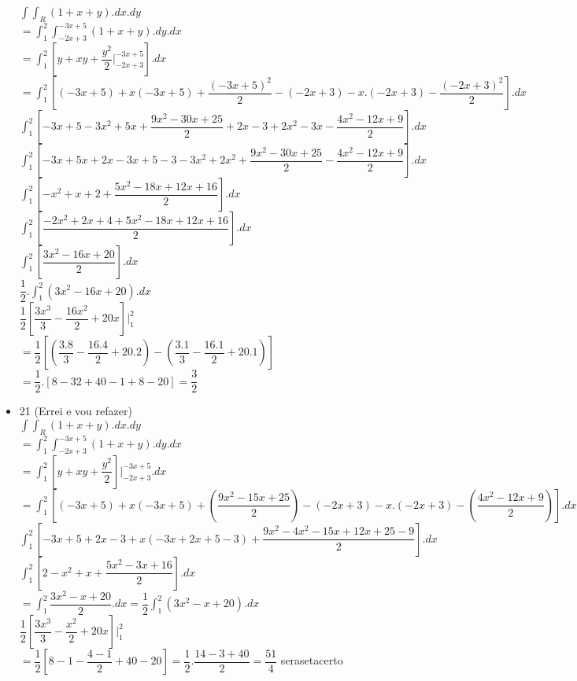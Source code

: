 \documentclass{article}
\begin{document}
\begin{itemize}
	$\int \int_R (1+x+y).dx.dy$\\
	$= \int_1^2 \int_{-2x+3}^{-3x+5} (1+x+y).dy.dx$\\
	$= \int_1^2[y+xy+\dfrac{y^2}{2}|_{-2x+3}^{-3x+5}].dx$\\
	$=\int_1^2[(-3x+5)+x(-3x+5)+\dfrac{(-3x+5)^2}{2}-(-2x+3)-x.(-2x+3)-\dfrac{(-2x+3)^2}{2}].dx$\\
	$\int_1^2[-3x+5-3x^2+5x+\dfrac{9x^2-30x+25}{2}+2x-3+2x^2-3x-\dfrac{4x^2-12x+9}{2}].dx$\\
	$\int_1^2[-3x+5x+2x-3x+5-3-3x^2+2x^2+\dfrac{9x^2-30x+25}{2}-\dfrac{4x^2-12x+9}{2}].dx$\\
	$\int_1^2[-x^2+x+2+\dfrac{5x^2-18x+12x+16}{2}].dx$\\
	$\int_1^2[\dfrac{-2x^2+2x+4+5x^2-18x+12x+16}{2}].dx$\\
	$\int_1^2[\dfrac{3x^2-16x+20}{2}].dx$\\
	$\dfrac{1}{2}.\int_1^2(3x^2-16x+20).dx$\\
	$\dfrac{1}{2}[\dfrac{3x^3}{3}-\dfrac{16x^2}{2}+20x]|_1^2$\\
	$=\dfrac{1}{2}[(\dfrac{3.8}{3}-\dfrac{16.4}{2}+20.2)-(\dfrac{3.1}{3}-\dfrac{16.1}{2}+20.1)]$\\
	$=\dfrac{1}{2}.[8-32+40-1+8-20]=\dfrac{3}{2}$
	\item 21 (Errei e vou refazer)\\
	$\int \int_R (1+x+y).dx.dy$\\
	$=\int_1^2\int_{-2x+3}^{-3x+5}(1+x+y).dy.dx$\\
	$=\int_1^2 [y+xy+\dfrac{y^2}{2}]|_{-2x+3}^{-3x+5}.dx$\\
	$=\int_1^2 [(-3x+5)+x(-3x+5)+(\dfrac{9x^2-15x+25}{2})-(-2x+3)-x.(-2x+3)-(\dfrac{4x^2-12x+9}{2})].dx$\\
	$\int_1^2 [-3x+5+2x-3+x(-3x+2x+5-3)+\dfrac{9x^2-4x^2-15x+12x+25-9}{2}].dx$
	$\int_1^2[2-x^2+x+\dfrac{5x^2-3x+16}{2}].dx$ \\
	$=\int_1^2\dfrac{3x^2-x+20}{2}.dx = \dfrac{1}{2}\int_1^2 (3x^2-x+20).dx$\\
	$\dfrac{1}{2}[\dfrac{3x^3}{3}-\dfrac{x^2}{2}+20x]|_1^2$\\
	$=\dfrac{1}{2}[8-1-\dfrac{4-1}{2}+40-20]=\dfrac{1}{2}.\dfrac{14-3+40}{2}=\dfrac{51}{4}$ serasetacerto
\end{itemize}
\end{document}
